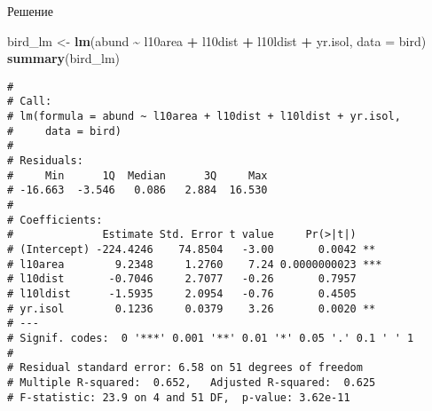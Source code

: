 \documentclass[
  ignorenonframetext,
  t,xcolor=table]{beamer}
\newenvironment{Shaded}{\begin{snugshade}}{\end{snugshade}}
\newcommand{\AttributeTok}[1]{\textcolor[rgb]{0.13,0.29,0.53}{#1}}
\newcommand{\FunctionTok}[1]{\textcolor[rgb]{0.13,0.29,0.53}{\textbf{#1}}}
\newcommand{\NormalTok}[1]{#1}
\newcommand{\OtherTok}[1]{\textcolor[rgb]{0.56,0.35,0.01}{#1}}
\newcommand{\SpecialCharTok}[1]{\textcolor[rgb]{0.81,0.36,0.00}{\textbf{#1}}}
\begin{document}
\begin{frame}[fragile]{Решение}
\protect\hypertarget{ux440ux435ux448ux435ux43dux438ux435}{}
\fontsize{10pt}{10pt}

\begin{Shaded}
\begin{Highlighting}[]
\NormalTok{bird\_lm }\OtherTok{\textless{}{-}} \FunctionTok{lm}\NormalTok{(abund }\SpecialCharTok{\textasciitilde{}}\NormalTok{ l10area }\SpecialCharTok{+}\NormalTok{ l10dist }\SpecialCharTok{+}\NormalTok{ l10ldist }\SpecialCharTok{+}\NormalTok{ yr.isol, }\AttributeTok{data =}\NormalTok{ bird)}
\FunctionTok{summary}\NormalTok{(bird\_lm)}
\end{Highlighting}
\end{Shaded}

\begin{verbatim}
# 
# Call:
# lm(formula = abund ~ l10area + l10dist + l10ldist + yr.isol, 
#     data = bird)
# 
# Residuals:
#     Min      1Q  Median      3Q     Max 
# -16.663  -3.546   0.086   2.884  16.530 
# 
# Coefficients:
#              Estimate Std. Error t value     Pr(>|t|)    
# (Intercept) -224.4246    74.8504   -3.00       0.0042 ** 
# l10area        9.2348     1.2760    7.24 0.0000000023 ***
# l10dist       -0.7046     2.7077   -0.26       0.7957    
# l10ldist      -1.5935     2.0954   -0.76       0.4505    
# yr.isol        0.1236     0.0379    3.26       0.0020 ** 
# ---
# Signif. codes:  0 '***' 0.001 '**' 0.01 '*' 0.05 '.' 0.1 ' ' 1
# 
# Residual standard error: 6.58 on 51 degrees of freedom
# Multiple R-squared:  0.652,   Adjusted R-squared:  0.625 
# F-statistic: 23.9 on 4 and 51 DF,  p-value: 3.62e-11
\end{verbatim}
\end{frame}
\end{document}
